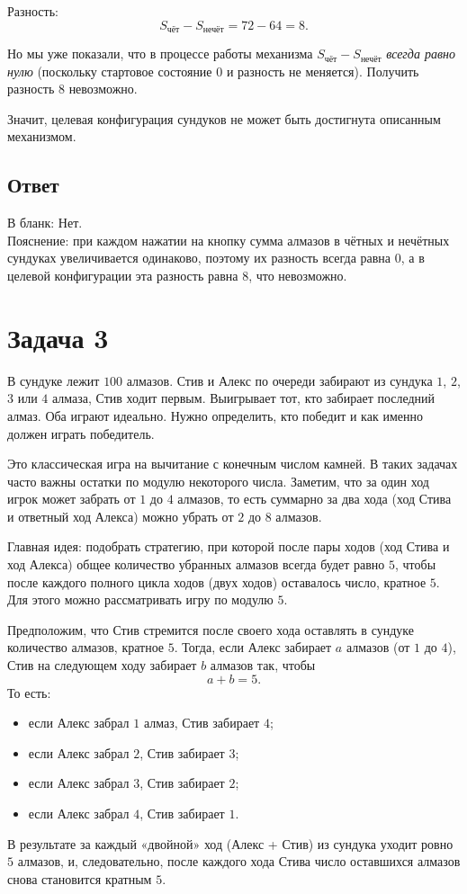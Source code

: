 \documentclass[12pt,a4paper]{article}
\begin{document}
Разность:
\[
S_{\text{чёт}} - S_{\text{нечёт}} = 72 - 64 = 8.
\]

Но мы уже показали, что в процессе работы механизма $S_{\text{чёт}} - S_{\text{нечёт}}$ \emph{всегда равно нулю} (поскольку стартовое состояние $0$ и разность не меняется). Получить разность $8$ невозможно.

Значит, целевая конфигурация сундуков не может быть достигнута описанным механизмом.

\subsection*{Ответ}
В бланк: Нет.\\
Пояснение: при каждом нажатии на кнопку сумма алмазов в чётных и нечётных сундуках увеличивается одинаково, поэтому их разность всегда равна $0$, а в целевой конфигурации эта разность равна $8$, что невозможно.

\newpage


\section*{Задача 3}

В сундуке лежит $100$ алмазов. Стив и Алекс по очереди забирают из сундука $1$, $2$, $3$ или $4$ алмаза, Стив ходит первым. Выигрывает тот, кто забирает последний алмаз. Оба играют идеально. Нужно определить, кто победит и как именно должен играть победитель.

Это классическая игра на вычитание с конечным числом камней. В таких задачах часто важны остатки по модулю некоторого числа. Заметим, что за один ход игрок может забрать от $1$ до $4$ алмазов, то есть суммарно за два хода (ход Стива и ответный ход Алекса) можно убрать от $2$ до $8$ алмазов.

Главная идея: подобрать стратегию, при которой после пары ходов (ход Стива и ход Алекса) общее количество убранных алмазов всегда будет равно $5$, чтобы после каждого полного цикла ходов (двух ходов) оставалось число, кратное $5$. Для этого можно рассматривать игру по модулю $5$.

Предположим, что Стив стремится после своего хода оставлять в сундуке количество алмазов, кратное $5$. Тогда, если Алекс забирает $a$ алмазов (от $1$ до $4$), Стив на следующем ходу забирает $b$ алмазов так, чтобы
\[
a + b = 5.
\]
То есть:
\begin{itemize}
  \item если Алекс забрал $1$ алмаз, Стив забирает $4$;
  \item если Алекс забрал $2$, Стив забирает $3$;
  \item если Алекс забрал $3$, Стив забирает $2$;
  \item если Алекс забрал $4$, Стив забирает $1$.
\end{itemize}
В результате за каждый «двойной» ход (Алекс + Стив) из сундука уходит ровно $5$ алмазов, и, следовательно, после каждого хода Стива число оставшихся алмазов снова становится кратным $5$.
\end{document}
